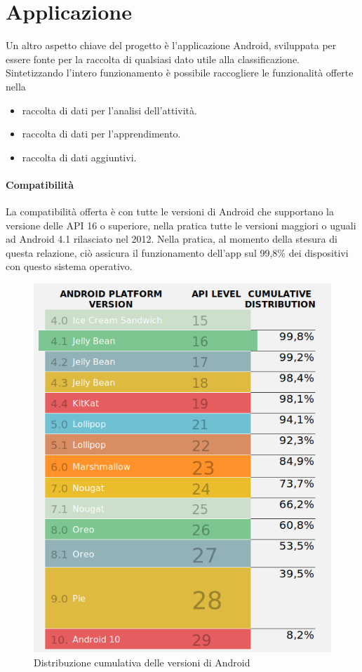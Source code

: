 \chapter{Applicazione}
\label{chapter:app}
Un altro aspetto chiave del progetto è l'applicazione Android, sviluppata per essere fonte per la 
raccolta di qualsiasi dato utile alla classificazione. Sintetizzando l'intero funzionamento è possibile 
raccogliere le funzionalità offerte nella
\begin{itemize}
    \item raccolta di dati per l'analisi dell'attività.
    \item raccolta di dati per l'apprendimento.
    \item raccolta di dati aggiuntivi.
\end{itemize}
\subsubsection{Compatibilità}
La compatibilità offerta è con tutte le versioni di Android che supportano la versione delle API 16 o superiore, nella pratica tutte
le versioni maggiori o uguali ad Android 4.1 rilasciato nel 2012. 
Nella pratica, al momento della stesura di questa relazione, ciò assicura il funzionamento dell'app sul 99,8\% dei dispositivi 
con questo sistema operativo.
\begin{figure}[H]
    \centering
    \includegraphics[scale = 0.40]{assets/images/android/compatibility.png}
    \caption{Distribuzione cumulativa delle versioni di Android}
    \label{fig:android-compatibility}
\end{figure}
